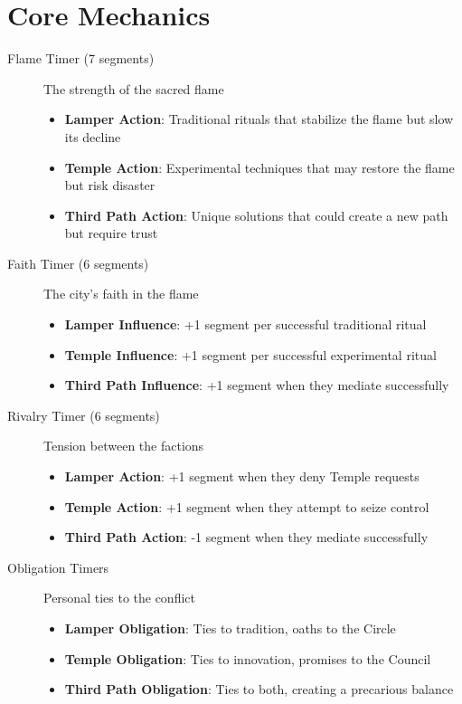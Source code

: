 \documentclass[12pt]{article}
\begin{document}
\section{Core Mechanics}

\begin{description}
    \item[Flame Timer (7 segments)] The strength of the sacred flame
    
    \begin{itemize}
        \item \textbf{Lamper Action}: Traditional rituals that stabilize the flame but slow its decline
        \item \textbf{Temple Action}: Experimental techniques that may restore the flame but risk disaster
        \item \textbf{Third Path Action}: Unique solutions that could create a new path but require trust
    \end{itemize}
    
    \item[Faith Timer (6 segments)] The city's faith in the flame
    
    \begin{itemize}
        \item \textbf{Lamper Influence}: +1 segment per successful traditional ritual
        \item \textbf{Temple Influence}: +1 segment per successful experimental ritual
        \item \textbf{Third Path Influence}: +1 segment when they mediate successfully
    \end{itemize}
    
    \item[Rivalry Timer (6 segments)] Tension between the factions
    
    \begin{itemize}
        \item \textbf{Lamper Action}: +1 segment when they deny Temple requests
        \item \textbf{Temple Action}: +1 segment when they attempt to seize control
        \item \textbf{Third Path Action}: -1 segment when they mediate successfully
    \end{itemize}
    
    \item[Obligation Timers] Personal ties to the conflict
    
    \begin{itemize}
        \item \textbf{Lamper Obligation}: Ties to tradition, oaths to the Circle
        \item \textbf{Temple Obligation}: Ties to innovation, promises to the Council
        \item \textbf{Third Path Obligation}: Ties to both, creating a precarious balance
    \end{itemize}
\end{description}
\end{document}
